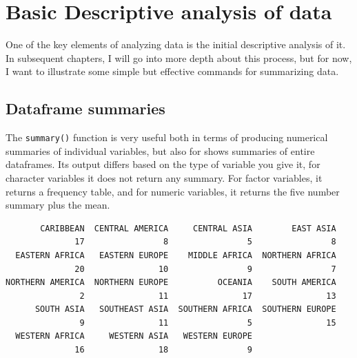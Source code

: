 \documentclass[
  letterpaper,
  DIV=11,
  numbers=noendperiod]{scrreprt}
\newenvironment{Shaded}{\begin{snugshade}}{\end{snugshade}}
\newcommand{\FunctionTok}[1]{\textcolor[rgb]{0.28,0.35,0.67}{#1}}
\newcommand{\NormalTok}[1]{\textcolor[rgb]{0.00,0.23,0.31}{#1}}
\newcommand{\SpecialCharTok}[1]{\textcolor[rgb]{0.37,0.37,0.37}{#1}}
\begin{document}
\hypertarget{basic-descriptive-analysis-of-data}{%
\section{Basic Descriptive analysis of
data}\label{basic-descriptive-analysis-of-data}}

One of the key elements of analyzing data is the initial descriptive
analysis of it. In subsequent chapters, I will go into more depth about
this process, but for now, I want to illustrate some simple but
effective commands for summarizing data.

\hypertarget{dataframe-summaries}{%
\subsection{Dataframe summaries}\label{dataframe-summaries}}

The \texttt{summary()} function is very useful both in terms of
producing numerical summaries of individual variables, but also for
shows summaries of entire dataframes. Its output differs based on the
type of variable you give it, for character variables it does not return
any summary. For factor variables, it returns a frequency table, and for
numeric variables, it returns the five number summary plus the mean.

\begin{Shaded}
\end{Shaded}

\begin{verbatim}
       CARIBBEAN  CENTRAL AMERICA     CENTRAL ASIA        EAST ASIA 
              17                8                5                8 
  EASTERN AFRICA   EASTERN EUROPE    MIDDLE AFRICA  NORTHERN AFRICA 
              20               10                9                7 
NORTHERN AMERICA  NORTHERN EUROPE          OCEANIA    SOUTH AMERICA 
               2               11               17               13 
      SOUTH ASIA   SOUTHEAST ASIA  SOUTHERN AFRICA  SOUTHERN EUROPE 
               9               11                5               15 
  WESTERN AFRICA     WESTERN ASIA   WESTERN EUROPE 
              16               18                9 
\end{verbatim}

\begin{Shaded}
\end{Shaded}
\end{document}

